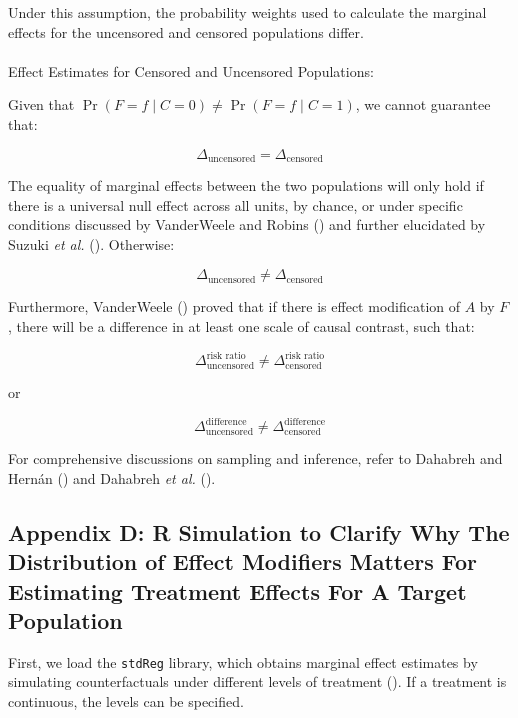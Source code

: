 \documentclass[
  single column]{article}
\makeatletter
\let\oldparagraph\paragraph
\renewcommand{\paragraph}{
    \@ifstar
      \xxxParagraphStar
      \xxxParagraphNoStar
  }
\newcommand{\xxxParagraphStar}[1]{\oldparagraph*{#1}\mbox{}}
\newcommand{\xxxParagraphNoStar}[1]{\oldparagraph{#1}\mbox{}}
\makeatother
\begin{document}
Under this assumption, the probability weights used to calculate the
marginal effects for the uncensored and censored populations differ.

\paragraph{Effect Estimates for Censored and Uncensored
Populations:}\label{effect-estimates-for-censored-and-uncensored-populations}

Given that \(\Pr(F=f \mid C=0) \neq \Pr(F=f \mid C=1)\), we cannot
guarantee that:

\[
\Delta_{\text{uncensored}} = \Delta_{\text{censored}}
\]

The equality of marginal effects between the two populations will only
hold if there is a universal null effect across all units, by chance, or
under specific conditions discussed by VanderWeele and Robins
() and further elucidated by Suzuki
\emph{et al.} ().
Otherwise:

\[
\Delta_{\text{uncensored}} \ne \Delta_{\text{censored}}
\]

Furthermore, VanderWeele () proved
that if there is effect modification of \(A\) by \(F\), there will be a
difference in at least one scale of causal contrast, such that:

\[
\Delta^{\text{risk ratio}}_{\text{uncensored}} \ne \Delta^{\text{risk ratio}}_{\text{censored}}
\]

or

\[
\Delta^{\text{difference}}_{\text{uncensored}} \ne \Delta^{\text{difference}}_{\text{censored}}
\]

For comprehensive discussions on sampling and inference, refer to
Dahabreh and Hernán () and Dahabreh
\emph{et al.} ().

\newpage{}

\subsection{Appendix D: R Simulation to Clarify Why The Distribution of
Effect Modifiers Matters For Estimating Treatment Effects For A Target
Population}\label{id-app-d}

First, we load the \texttt{stdReg} library, which obtains marginal
effect estimates by simulating counterfactuals under different levels of
treatment (). If a
treatment is continuous, the levels can be specified.
\end{document}
